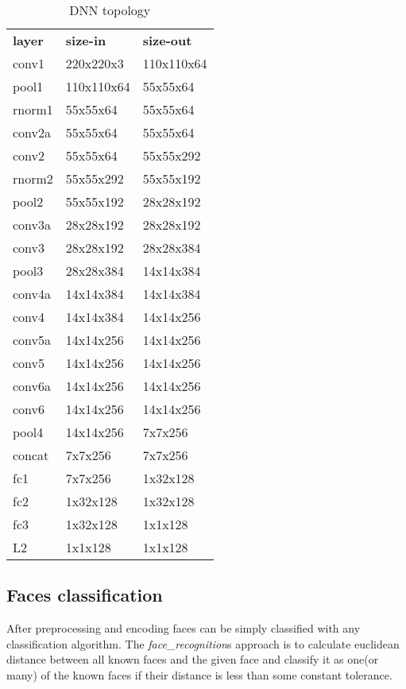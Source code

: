 \documentclass[hidelinks, english]{mvi-report}
\begin{document}
    \begin{table}[htb]
        \begin{tabular}{lll}
            \textbf{layer} & \textbf{size-in} & \textbf{size-out} \\
            conv1 & 220x220x3 & 110x110x64        \\
            pool1 & 110x110x64 & 55x55x64          \\
            rnorm1 & 55x55x64 & 55x55x64          \\
            conv2a & 55x55x64 & 55x55x64          \\
            conv2 & 55x55x64 & 55x55x292         \\
            rnorm2 & 55x55x292 & 55x55x192         \\
            pool2 & 55x55x192 & 28x28x192         \\
            conv3a & 28x28x192 & 28x28x192         \\
            conv3 & 28x28x192 & 28x28x384         \\
            pool3 & 28x28x384 & 14x14x384         \\
            conv4a & 14x14x384 & 14x14x384         \\
            conv4 & 14x14x384 & 14x14x256         \\
            conv5a & 14x14x256 & 14x14x256         \\
            conv5 & 14x14x256 & 14x14x256         \\
            conv6a & 14x14x256 & 14x14x256         \\
            conv6 & 14x14x256 & 14x14x256         \\
            pool4 & 14x14x256 & 7x7x256           \\
            concat & 7x7x256 & 7x7x256           \\
            fc1 & 7x7x256 & 1x32x128          \\
            fc2 & 1x32x128 & 1x32x128          \\
            fc3 & 1x32x128 & 1x1x128           \\
            L2 & 1x1x128 & 1x1x128
        \end{tabular}
        \caption{DNN topology}
    \end{table}


    \subsection{Faces classification}\label{sub:classification}
    After preprocessing and encoding faces can be simply classified with any classification algorithm.
    The \textit{face\_recognition}s approach is to calculate euclidean distance between all known faces and the given
    face and classify it as one(or many) of the known faces if their distance is less than some constant tolerance.
\end{document}
